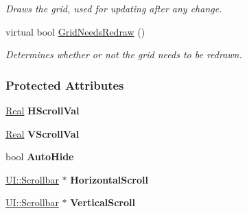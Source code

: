 \begin{DoxyCompactItemize}
\begin{DoxyCompactList}\small\item\em Draws the grid, used for updating after any change. \item\end{DoxyCompactList}\item 
\hypertarget{classphys_1_1UI_1_1ScrolledCellGrid_a726ac5925e2b13110ac7bc92788904e0}{
virtual bool \hyperlink{classphys_1_1UI_1_1ScrolledCellGrid_a726ac5925e2b13110ac7bc92788904e0}{GridNeedsRedraw} ()}
\label{d5/db4/classphys_1_1UI_1_1ScrolledCellGrid_a726ac5925e2b13110ac7bc92788904e0}

\begin{DoxyCompactList}\small\item\em Determines whether or not the grid needs to be redrawn. \item\end{DoxyCompactList}\end{DoxyCompactItemize}
\subsubsection*{Protected Attributes}
\begin{DoxyCompactItemize}
\item 
\hypertarget{classphys_1_1UI_1_1ScrolledCellGrid_a0621569548639e6293a4023f4f90f909}{
\hyperlink{namespacephys_af7eb897198d265b8e868f45240230d5f}{Real} {\bfseries HScrollVal}}
\label{d5/db4/classphys_1_1UI_1_1ScrolledCellGrid_a0621569548639e6293a4023f4f90f909}

\item 
\hypertarget{classphys_1_1UI_1_1ScrolledCellGrid_a87f8e96ba30a29c6f466c06ba7f06b91}{
\hyperlink{namespacephys_af7eb897198d265b8e868f45240230d5f}{Real} {\bfseries VScrollVal}}
\label{d5/db4/classphys_1_1UI_1_1ScrolledCellGrid_a87f8e96ba30a29c6f466c06ba7f06b91}

\item 
\hypertarget{classphys_1_1UI_1_1ScrolledCellGrid_a07339986f5695fbaf9ef25a584c1d28f}{
bool {\bfseries AutoHide}}
\label{d5/db4/classphys_1_1UI_1_1ScrolledCellGrid_a07339986f5695fbaf9ef25a584c1d28f}

\item 
\hypertarget{classphys_1_1UI_1_1ScrolledCellGrid_ae979ab2f4889db9517317cc0cf3e37f9}{
\hyperlink{classphys_1_1UI_1_1Scrollbar}{UI::Scrollbar} $\ast$ {\bfseries HorizontalScroll}}
\label{d5/db4/classphys_1_1UI_1_1ScrolledCellGrid_ae979ab2f4889db9517317cc0cf3e37f9}

\item 
\hypertarget{classphys_1_1UI_1_1ScrolledCellGrid_a8bb7423d7d222b977d777098f7fb3217}{
\hyperlink{classphys_1_1UI_1_1Scrollbar}{UI::Scrollbar} $\ast$ {\bfseries VerticalScroll}}
\label{d5/db4/classphys_1_1UI_1_1ScrolledCellGrid_a8bb7423d7d222b977d777098f7fb3217}

\end{DoxyCompactItemize}


